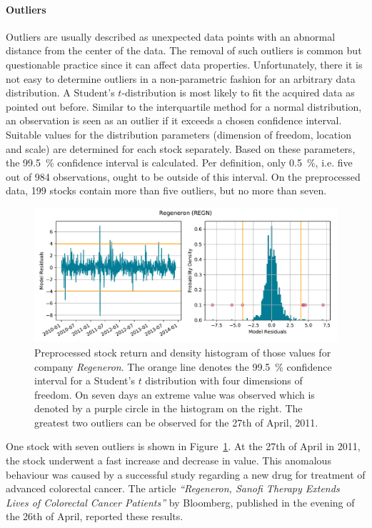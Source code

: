 \paragraph{Outliers}
Outliers are usually described as unexpected data points with an abnormal distance from the center of the data. The removal of such outliers is common but questionable practice since it can affect data properties. Unfortunately, there it is not easy to determine outliers in a non-parametric fashion for an arbitrary data distribution. A Student's $t$-distribution is most likely to fit the acquired data as pointed out before. Similar to the interquartile method for a normal distribution, an observation is seen as an outlier if it exceeds a chosen confidence interval. Suitable values for the distribution parameters (dimension of freedom, location and scale) are determined for each stock separately. Based on these parameters, the 99.5~\% confidence interval is calculated. Per definition, only 0.5~\%, i.e. five out of 984 observations, ought to be outside of this interval. On the preprocessed data, 199 stocks contain more than five outliers, but no more than seven.

\begin{figure}[!ht]
    \centering
    \includegraphics[width=\textwidth]{figures/regression/data-outliers-REGN.pdf}
    \caption{Preprocessed stock return and density histogram of those values for company \emph{Regeneron}. The orange line denotes the 99.5~\% confidence interval for a Student's $t$ distribution with four dimensions of freedom. On seven days an extreme value was observed which is denoted by a purple circle in the histogram on the right. The greatest two outliers can be observed for the 27th of April, 2011.}
    \label{fig:data_outliers}
\end{figure}

One stock with seven outliers is shown in Figure~\ref{fig:data_outliers}. At the 27th of April in 2011, the stock underwent a fast increase and decrease in value. This anomalous behaviour was caused by a successful study regarding a new drug for treatment of advanced colorectal cancer. The article \emph{\enquote{Regeneron, Sanofi Therapy Extends Lives of Colorectal Cancer Patients}} by Bloomberg, published in the evening of the 26th of April, reported these results.
 
